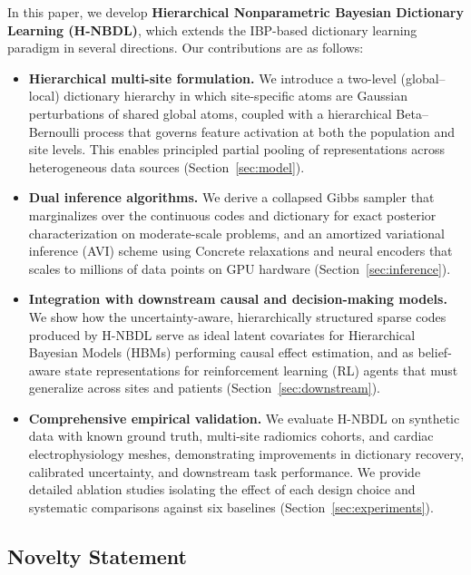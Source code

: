 \documentclass[11pt,a4paper]{article}
\theoremstyle{definition}
\begin{document}
In this paper, we develop \textbf{Hierarchical Nonparametric Bayesian Dictionary Learning (H-NBDL)}, which extends the IBP-based dictionary learning paradigm in several directions. Our contributions are as follows:
\begin{itemize}[leftmargin=*,nosep]
  \item \textbf{Hierarchical multi-site formulation.} We introduce a two-level (global--local) dictionary hierarchy in which site-specific atoms are Gaussian perturbations of shared global atoms, coupled with a hierarchical Beta--Bernoulli process that governs feature activation at both the population and site levels. This enables principled partial pooling of representations across heterogeneous data sources (Section~\ref{sec:model}).
  \item \textbf{Dual inference algorithms.} We derive a collapsed Gibbs sampler that marginalizes over the continuous codes and dictionary for exact posterior characterization on moderate-scale problems, and an amortized variational inference (AVI) scheme using Concrete relaxations and neural encoders that scales to millions of data points on GPU hardware (Section~\ref{sec:inference}).
  \item \textbf{Integration with downstream causal and decision-making models.} We show how the uncertainty-aware, hierarchically structured sparse codes produced by H-NBDL serve as ideal latent covariates for Hierarchical Bayesian Models (HBMs) performing causal effect estimation, and as belief-aware state representations for reinforcement learning (RL) agents that must generalize across sites and patients (Section~\ref{sec:downstream}).
  \item \textbf{Comprehensive empirical validation.} We evaluate H-NBDL on synthetic data with known ground truth, multi-site radiomics cohorts, and cardiac electrophysiology meshes, demonstrating improvements in dictionary recovery, calibrated uncertainty, and downstream task performance. We provide detailed ablation studies isolating the effect of each design choice and systematic comparisons against six baselines (Section~\ref{sec:experiments}).
\end{itemize}

\subsection{Novelty Statement}\label{sec:novelty}
\end{document}

